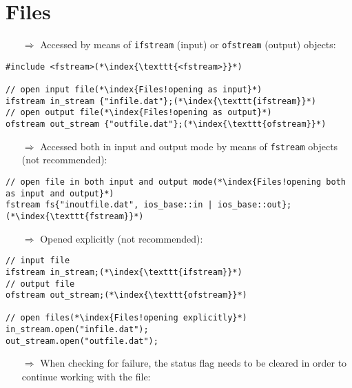 \documentclass[10pt]{article}
\begin{document}
\section{Files}
\small
\begin{enumerate}
\item[$\Rightarrow$] Accessed by means of \texttt{ifstream} (input) or \texttt{ofstream} (output) objects:
\end{enumerate}
\begin{lstlisting}
#include <fstream>(*\index{\texttt{<fstream>}}*)

// open input file(*\index{Files!opening as input}*)
ifstream in_stream {"infile.dat"};(*\index{\texttt{ifstream}}*)
// open output file(*\index{Files!opening as output}*)
ofstream out_stream {"outfile.dat"};(*\index{\texttt{ofstream}}*)
\end{lstlisting}
\begin{enumerate}
\item[$\Rightarrow$] Accessed both in input and output mode by means of \texttt{fstream} objects (not recommended):
\end{enumerate}
\begin{lstlisting}
// open file in both input and output mode(*\index{Files!opening both as input and output}*)
fstream fs{"inoutfile.dat", ios_base::in | ios_base::out};(*\index{\texttt{fstream}}*)
\end{lstlisting}
\begin{enumerate}
\item[$\Rightarrow$] Opened explicitly (not recommended):
\end{enumerate}
\begin{lstlisting}
// input file 
ifstream in_stream;(*\index{\texttt{ifstream}}*)
// output file
ofstream out_stream;(*\index{\texttt{ofstream}}*)

// open files(*\index{Files!opening explicitly}*)
in_stream.open("infile.dat");
out_stream.open("outfile.dat");
\end{lstlisting}
\begin{enumerate}
\item[$\Rightarrow$] When checking for failure, the status flag needs to be cleared in order to continue working with the file:
\end{enumerate}
\end{document}
